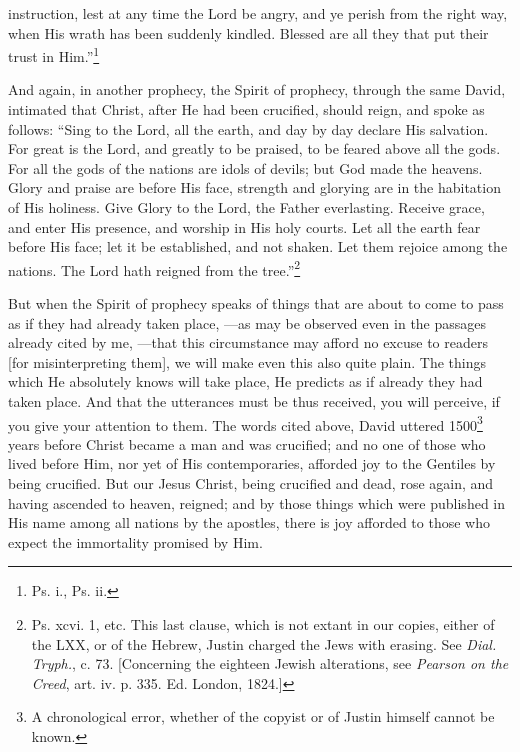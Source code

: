 instruction, lest at any time the Lord be angry, and ye perish from the right way, when His wrath has been suddenly kindled. Blessed are all they that put their trust in Him.”\footnote{Ps. i., Ps. ii.}


And again, in another prophecy, the Spirit of prophecy, through the same David, intimated that Christ, after He had been crucified, should reign, and spoke as follows: “Sing to the Lord, all the earth, and day by day declare His salvation. For great is the Lord, and greatly to be praised, to be feared above all the gods. For all the gods of the nations are idols of devils; but God made the heavens. Glory and praise are before His face, strength and glorying are in the habitation of His holiness. Give Glory to the Lord, the Father everlasting. Receive grace, and enter His presence, and worship in His holy courts. Let all the earth fear before His face; let it be established, and not shaken. Let them rejoice among the nations. The Lord hath reigned from the tree.”\footnote{Ps. xcvi. 1, etc. This last clause, which is not extant in our copies, either of the LXX, or of the Hebrew, Justin charged the Jews with erasing. See \emph{Dial. Tryph.}, c. 73. [Concerning the eighteen Jewish alterations, see \emph{Pearson on the Creed}, art. iv. p. 335. Ed. London, 1824.]}


But when the Spirit of prophecy speaks of things that are about to come to pass as if they had already taken place, —as may be observed even in the passages already cited by me, —that  this circumstance may afford no excuse to readers [for misinterpreting them], we will make even this also quite plain. The things which He absolutely knows will take place, He predicts as if already they had taken place. And that the utterances must be thus received, you will perceive, if you give your attention to them. The words cited above, David uttered 1500\footnote{A chronological error, whether of the copyist or of Justin himself cannot be known.} years before Christ became a man and was crucified; and no one of those who lived before Him, nor yet of His contemporaries, afforded joy to the Gentiles by being crucified. But our Jesus Christ, being crucified and dead, rose again, and having ascended to heaven, reigned; and by those things which were published in His name among all nations by the apostles, there is joy afforded to those who expect the immortality promised by Him.

